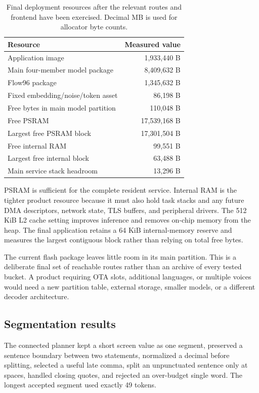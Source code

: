 \documentclass[10pt]{article}
\begin{document}
\begin{table}[t]
\centering
\caption{Final deployment resources after the relevant routes and frontend
have been exercised. Decimal MB is used for allocator byte counts.}
\label{tab:resources}
\small
\begin{tabularx}{\linewidth}{@{}Yr@{}}
\toprule
Resource & Measured value \\
\midrule
Application image & 1,933,440 B \\
Main four-member model package & 8,409,632 B \\
Flow96 package & 1,345,632 B \\
Fixed embedding/noise/token asset & 86,198 B \\
Free bytes in main model partition & 110,048 B \\
Free PSRAM & 17,539,168 B \\
Largest free PSRAM block & 17,301,504 B \\
Free internal RAM & 99,551 B \\
Largest free internal block & 63,488 B \\
Main service stack headroom & 13,296 B \\
\bottomrule
\end{tabularx}
\end{table}

PSRAM is sufficient for the complete resident service. Internal RAM is the
tighter product resource because it must also hold task stacks and any future
DMA descriptors, network state, TLS buffers, and peripheral drivers. The
512 KiB L2 cache setting improves inference and removes on-chip memory from the
heap. The final application retains a 64 KiB internal-memory reserve and
measures the largest contiguous block rather than relying on total free bytes.

The current flash package leaves little room in its main partition. This is a
deliberate final set of reachable routes rather than an archive of every tested
bucket. A product requiring OTA slots, additional languages, or multiple
voices would need a new partition table, external storage, smaller models, or
a different decoder architecture.

\subsection{Segmentation results}

The connected planner kept a short screen value as one segment, preserved a
sentence boundary between two statements, normalized a decimal before
splitting, selected a useful late comma, split an unpunctuated sentence only
at spaces, handled closing quotes, and rejected an over-budget single word.
The longest accepted segment used exactly 49 tokens.
\end{document}
